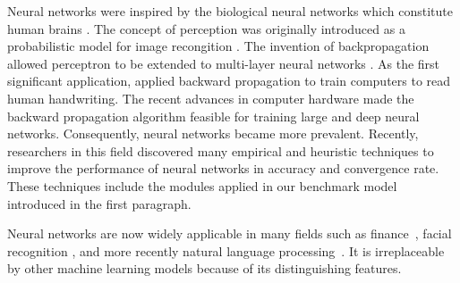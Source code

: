 Neural networks were inspired by the biological neural networks which constitute human brains \citep{10.2307/4299364}.
The concept of perception was originally introduced as a probabilistic model for image recongition \citep{rosenblatt}.
The invention of backpropagation allowed perceptron to be extended to multi-layer neural networks \citep{58337}.
As the first significant application, \citet{NIPS1989293} applied backward propagation to train computers to read human handwriting. 
The recent advances in computer hardware made the backward propagation algorithm feasible for training large and deep neural networks. 
Consequently, neural networks became more prevalent. 
Recently, researchers in this field discovered many empirical and heuristic techniques to improve the performance of neural networks in accuracy and convergence rate. These techniques include the modules applied in our benchmark model introduced in the first paragraph.



Neural networks are now widely applicable in many fields such as finance~\citep{Azoff:1994:NNT:561452,KAASTRA1996215}, facial recognition \citep{554195,655647}, and more recently natural language processing~\citep{Collobert:2008:UAN:1390156.1390177,Collobert:2011:NLP:1953048.2078186}.  It is irreplaceable by other machine learning models because of its distinguishing features. 


